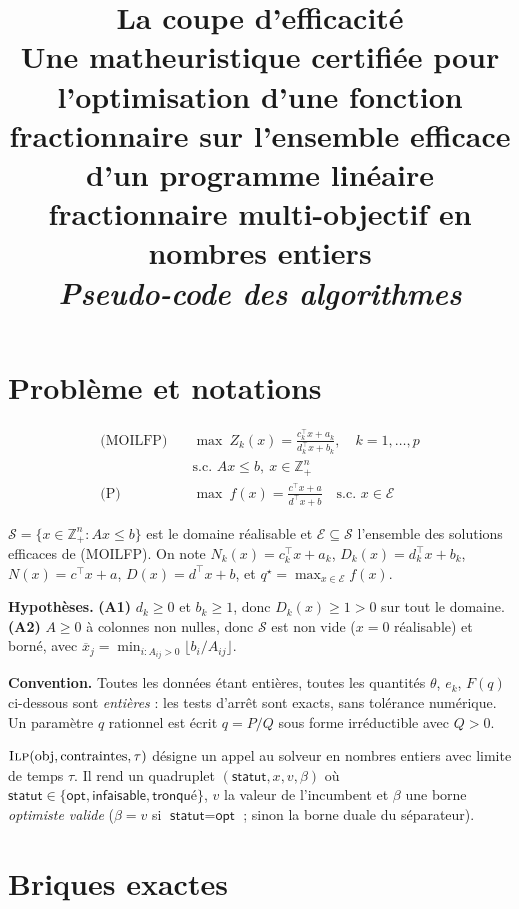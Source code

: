 \documentclass[11pt,a4paper]{article}
\title{\bfseries La coupe d'efficacité\\[2pt]
\large Une matheuristique certifiée pour l'optimisation d'une fonction
fractionnaire sur l'ensemble efficace d'un programme linéaire fractionnaire
multi-objectif en nombres entiers\\[6pt]
\normalsize\itshape Pseudo-code des algorithmes}
\author{}
\date{}
\newcommand{\Zk}{Z_k}
\newcommand{\Nk}{N_k}
\newcommand{\Dk}{D_k}
\newcommand{\Ecal}{\mathcal{E}}
\newcommand{\Scal}{\mathcal{S}}
\newcommand{\ILP}{\textsc{Ilp}}
\begin{document}
\maketitle
\vspace{-2.2\baselineskip}

\section{Problème et notations}

\begin{align*}
  \text{(MOILFP)}\quad & \max\ \Zk(x)=\frac{c_k^{\!\top}x+a_k}{d_k^{\!\top}x+b_k},
    \quad k=1,\dots,p\\
  & \text{s.c. } Ax\le b,\ x\in\mathbb{Z}^n_+\\[6pt]
  \text{(P)}\quad & \max\ f(x)=\frac{c^{\!\top}x+a}{d^{\!\top}x+b}
    \quad\text{s.c. } x\in\Ecal
\end{align*}

\noindent
$\Scal=\{x\in\mathbb{Z}^n_+ : Ax\le b\}$ est le domaine réalisable et
$\Ecal\subseteq\Scal$ l'ensemble des solutions efficaces de (MOILFP).
On note $\Nk(x)=c_k^{\!\top}x+a_k$, $\Dk(x)=d_k^{\!\top}x+b_k$,
$N(x)=c^{\!\top}x+a$, $D(x)=d^{\!\top}x+b$, et $q^\star=\max_{x\in\Ecal}f(x)$.

\medskip\noindent
\textbf{Hypothèses.}
\textbf{(A1)} $d_k\ge 0$ et $b_k\ge 1$, donc $\Dk(x)\ge 1>0$ sur tout le domaine.
\textbf{(A2)} $A\ge 0$ à colonnes non nulles, donc $\Scal$ est non vide
($x=0$ réalisable) et borné, avec
$\overline{x}_j=\min_{i:A_{ij}>0}\lfloor b_i/A_{ij}\rfloor$.

\medskip\noindent
\textbf{Convention.} Toutes les données étant entières, toutes les quantités
$\theta$, $e_k$, $F(q)$ ci-dessous sont \emph{entières} : les tests d'arrêt
sont exacts, sans tolérance numérique. Un paramètre $q$ rationnel est écrit
$q=P/Q$ sous forme irréductible avec $Q>0$.

\medskip\noindent
$\ILP(\text{obj},\text{contraintes},\tau)$ désigne un appel au solveur en
nombres entiers avec limite de temps $\tau$. Il rend un quadruplet
$(\textsf{statut},x,v,\beta)$ où $\textsf{statut}\in\{\textsf{opt},
\textsf{infaisable},\textsf{tronqué}\}$, $v$ la valeur de l'incumbent et
$\beta$ une borne \emph{optimiste valide} ($\beta=v$ si $\textsf{statut}
=\textsf{opt}$ ; sinon la borne duale du séparateur).

\section{Briques exactes}
\end{document}
